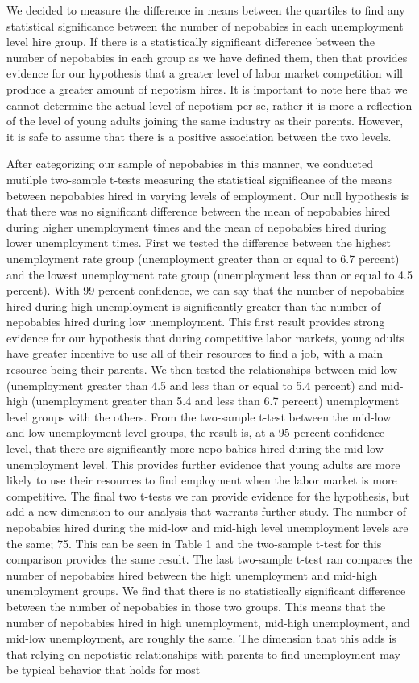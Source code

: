 \documentclass[12pt]{article}
\begin{document}
We decided to measure the difference in means between the quartiles to find any statistical significance between the number of nepobabies in each unemployment level hire group. If there is a statistically significant difference between the number of nepobabies in each group as we have defined them, then that provides evidence for our hypothesis that a greater level of labor market competition will produce a greater amount of nepotism hires. It is important to note here that we cannot determine the actual level of nepotism per se, rather it is more a reflection of the level of young adults joining the same industry as their parents. However, it is safe to assume that there is a positive association between the two levels.


After categorizing our sample of nepobabies in this manner, we conducted mutilple two-sample t-tests measuring the statistical significance of the means between nepobabies hired in varying levels of employment. Our null hypothesis is that there was no significant difference between the mean of nepobabies hired during higher unemployment times and the mean of nepobabies hired during lower unemployment times. First we tested the difference between the highest unemployment rate group (unemployment greater than or equal to 6.7 percent) and the lowest unemployment rate group (unemployment less than or equal to 4.5 percent). With 99 percent confidence, we can say that the number of nepobabies hired during high unemployment is significantly greater than the number of nepobabies hired during low unemployment. This first result provides strong evidence for our hypothesis that during competitive labor markets, young adults have greater incentive to use all of their resources to find a job, with a main resource being their parents.  We then tested the relationships between mid-low (unemployment greater than 4.5 and less than or equal to 5.4 percent) and mid-high (unemployment greater than 5.4 and less than 6.7 percent) unemployment level groups with the others. From the two-sample t-test between the mid-low and low unemployment level groups, the result is, at a 95 percent confidence level, that there are significantly more nepo-babies hired during the mid-low unemployment level. This provides further evidence that young adults are more likely to use their resources to find employment when the labor market is more competitive. The final two t-tests we ran provide evidence for the hypothesis, but add a new dimension to our analysis that warrants further study. The number of nepobabies hired during the mid-low and mid-high level unemployment levels are the same; 75. This can be seen in Table 1 and the two-sample t-test for this comparison provides the same result. The last two-sample t-test ran compares the number of nepobabies hired between the high unemployment and mid-high unemployment groups.  We find that there is no statistically significant difference between the number of nepobabies in those two groups. This means that the number of nepobabies hired in high unemployment, mid-high unemployment, and mid-low unemployment, are roughly the same. The dimension that this adds is that relying on nepotistic relationships with parents to find unemployment may be typical behavior that holds for most 
\end{document}
